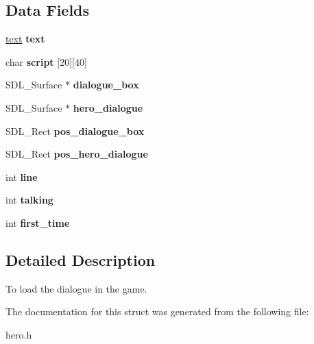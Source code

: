 \subsection*{Data Fields}
\begin{DoxyCompactItemize}
\item 
\mbox{\label{structDialogue_a468a4ed40fc86b7b9e8ad36b85af9ed9}} 
\hyperlink{structtext}{text} {\bfseries text}
\item 
\mbox{\label{structDialogue_adeefc1c305f4c968d8f93d609d1300ce}} 
char {\bfseries script} \mbox{[}20\mbox{]}\mbox{[}40\mbox{]}
\item 
\mbox{\label{structDialogue_a71983813bfe132b35f8faff9b78f0d16}} 
S\+D\+L\+\_\+\+Surface $\ast$ {\bfseries dialogue\+\_\+box}
\item 
\mbox{\label{structDialogue_a7c24d1a699a47a9fefda94cf300b1c37}} 
S\+D\+L\+\_\+\+Surface $\ast$ {\bfseries hero\+\_\+dialogue}
\item 
\mbox{\label{structDialogue_af71b90933f9885932ce341dc0e873697}} 
S\+D\+L\+\_\+\+Rect {\bfseries pos\+\_\+dialogue\+\_\+box}
\item 
\mbox{\label{structDialogue_aa20be35dbfed8b7a4e47c4752db6490a}} 
S\+D\+L\+\_\+\+Rect {\bfseries pos\+\_\+hero\+\_\+dialogue}
\item 
\mbox{\label{structDialogue_abb24b97d5e978d5459abd474a2521940}} 
int {\bfseries line}
\item 
\mbox{\label{structDialogue_a843bd3e6ea34d7e9eb8b240629d4158b}} 
int {\bfseries talking}
\item 
\mbox{\label{structDialogue_a813c5d98ac22180b91f7e48a3d0e9f46}} 
int {\bfseries first\+\_\+time}
\end{DoxyCompactItemize}


\subsection{Detailed Description}
To load the dialogue in the game. 

The documentation for this struct was generated from the following file\+:\begin{DoxyCompactItemize}
\item 
hero.\+h\end{DoxyCompactItemize}
